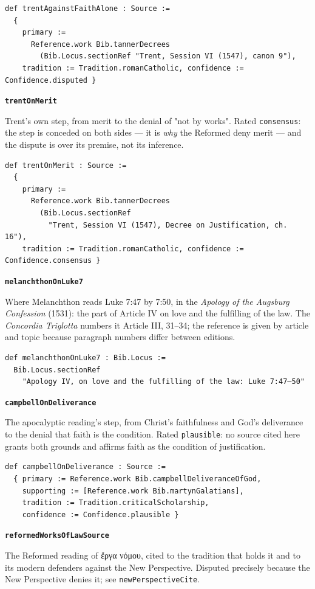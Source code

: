 \documentclass[11pt]{article}
\begin{document}
{\small\begin{verbatim}
def trentAgainstFaithAlone : Source :=
  {
    primary :=
      Reference.work Bib.tannerDecrees
        (Bib.Locus.sectionRef "Trent, Session VI (1547), canon 9"),
    tradition := Tradition.romanCatholic, confidence := Confidence.disputed }
\end{verbatim}}
\par\medskip\noindent\textbf{\texttt{trent\allowbreak{}On\allowbreak{}Merit}}\par\nobreak\noindent
Trent's own step, from merit to the denial of "not by works". Rated \texttt{consensus}: the step is conceded on both sides — it is \emph{why} the Reformed deny merit — and the dispute is over its premise, not its inference.

{\small\begin{verbatim}
def trentOnMerit : Source :=
  {
    primary :=
      Reference.work Bib.tannerDecrees
        (Bib.Locus.sectionRef
          "Trent, Session VI (1547), Decree on Justification, ch. 16"),
    tradition := Tradition.romanCatholic, confidence := Confidence.consensus }
\end{verbatim}}
\par\medskip\noindent\textbf{\texttt{melanchthon\allowbreak{}On\allowbreak{}Luke7}}\par\nobreak\noindent
Where Melanchthon reads Luke 7:47 by 7:50, in the \emph{Apology of the Augsburg Confession} (1531): the part of Article IV on love and the fulfilling of the law. The \emph{Concordia Triglotta} numbers it Article III, 31–34; the reference is given by article and topic because paragraph numbers differ between editions.

{\small\begin{verbatim}
def melanchthonOnLuke7 : Bib.Locus :=
  Bib.Locus.sectionRef
    "Apology IV, on love and the fulfilling of the law: Luke 7:47–50"
\end{verbatim}}
\par\medskip\noindent\textbf{\texttt{campbell\allowbreak{}On\allowbreak{}Deliverance}}\par\nobreak\noindent
The apocalyptic reading's step, from Christ's faithfulness and God's deliverance to the denial that faith is the condition. Rated \texttt{plausible}: no source cited here grants both grounds and affirms faith as the condition of justification.

{\small\begin{verbatim}
def campbellOnDeliverance : Source :=
  { primary := Reference.work Bib.campbellDeliveranceOfGod,
    supporting := [Reference.work Bib.martynGalatians],
    tradition := Tradition.criticalScholarship,
    confidence := Confidence.plausible }
\end{verbatim}}
\par\medskip\noindent\textbf{\texttt{reformed\allowbreak{}Works\allowbreak{}Of\allowbreak{}Law\allowbreak{}Source}}\par\nobreak\noindent
The Reformed reading of ἔργα νόμου, cited to the tradition that holds it and to its modern defenders against the New Perspective. Disputed precisely because the New Perspective denies it; see \texttt{new\allowbreak{}Perspective\allowbreak{}Cite}.
\end{document}
